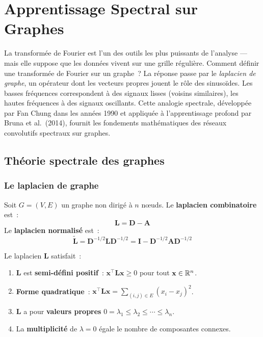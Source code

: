 \chapter{Apprentissage Spectral sur Graphes}
\label{ch:spectral}

La transform\'ee de Fourier est l'un des outils les plus puissants de l'analyse --- mais elle suppose que les donn\'ees vivent sur une grille r\'eguli\`ere. Comment d\'efinir une transform\'ee de Fourier sur un graphe~? La r\'eponse passe par le \emph{laplacien de graphe}, un op\'erateur dont les vecteurs propres jouent le r\^ole des sinuso\"ides. Les basses fr\'equences correspondent \`a des signaux lisses (voisins similaires), les hautes fr\'equences \`a des signaux oscillants. Cette analogie spectrale, d\'evelopp\'ee par Fan Chung dans les ann\'ees 1990 et appliqu\'ee \`a l'apprentissage profond par Bruna et al.\ (2014), fournit les fondements math\'ematiques des r\'eseaux convolutifs spectraux sur graphes.

\section{Th\'eorie spectrale des graphes}

\subsection{Le laplacien de graphe}

\begin{definition}
Soit $G = (V, E)$ un graphe non dirig\'e \`a $n$ n\oe uds. Le \textbf{laplacien
combinatoire} est~:
\[
    \mathbf{L} = \mathbf{D} - \mathbf{A}
\]
Le \textbf{laplacien normalis\'e} est~:
\[
    \tilde{\mathbf{L}} = \mathbf{D}^{-1/2}\mathbf{L}\mathbf{D}^{-1/2}
    = \mathbf{I} - \mathbf{D}^{-1/2}\mathbf{A}\mathbf{D}^{-1/2}
\]
\end{definition}

\begin{theoreme}
Le laplacien $\mathbf{L}$ satisfait~:
\begin{enumerate}
    \item $\mathbf{L}$ est \textbf{semi-d\'efini positif}~: $\mathbf{x}^\top \mathbf{L} \mathbf{x} \geq 0$
          pour tout $\mathbf{x} \in \mathbb{R}^n$.
    \item \textbf{Forme quadratique}~:
          $\mathbf{x}^\top \mathbf{L} \mathbf{x} = \sum_{(i,j) \in E} (x_i - x_j)^2$.
    \item $\mathbf{L}$ a pour \textbf{valeurs propres} $0 = \lambda_1 \leq \lambda_2 \leq \cdots \leq \lambda_n$.
    \item La \textbf{multiplicit\'e} de $\lambda = 0$ \'egale le nombre de
          composantes connexes.
\end{enumerate}
\end{theoreme}

